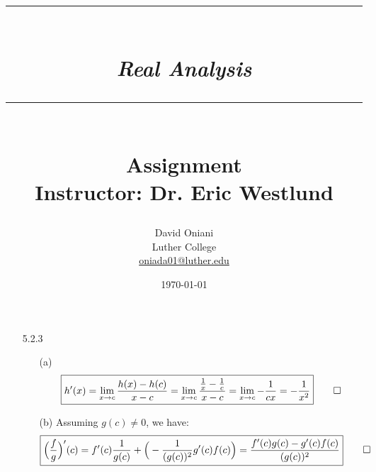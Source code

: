 \documentclass[11pt]{article}
\author{David Oniani\\
        Luther College\\
        \href{mailto:oniada01@luther.edu}{oniada01@luther.edu}}
\title{\rule{\paperwidth - 150pt}{1pt}\textbf{\\\textit{Real Analysis}\\}\rule
{\paperwidth - 150pt}{1pt}\\\textbf{Assignment \textnumero9}\\{\normalsize
Instructor: Dr. Eric Westlund}}
\date{\today}
\begin{document}
\maketitle

%
%
%

\begin{itemize}
    \item[5.2.3]
        \begin{itemize}
            \item[(a)]
                \begin{equation*}
                    \boxed{
                        h^\prime(x) = \lim_{x \to c}{\frac{h(x) - h(c)}{x - c}}
                                    = \lim_{x \to c}{\frac{\frac{1}{x} - \frac{1}{c}}{x - c}}
                                    = \lim_{x \to c}{-\frac{1}{cx}}
                                    = -\frac{1}{x^2}
                        }
                        \qed
                \end{equation*}

            \item[]
            \item[]
            \item[]
            \item[]
            \item[]

            \item[(b)]
                Assuming $g(c) \neq 0$, we have:
                \begin{equation*}
                    \boxed{
                        \Big(\frac{f}{g}\Big)^\prime(c) = f^\prime(c)\frac{1}{g(c)} + \Big(- \frac{1}{(g(c))^2}g^\prime(c)f(c)\Big)
                                                        = \frac{f^\prime(c)g(c) - g^\prime(c)f(c)}{(g(c))^2}
                        }
                        \qed
                \end{equation*}


\end{itemize}
\end{itemize}
\end{document}
